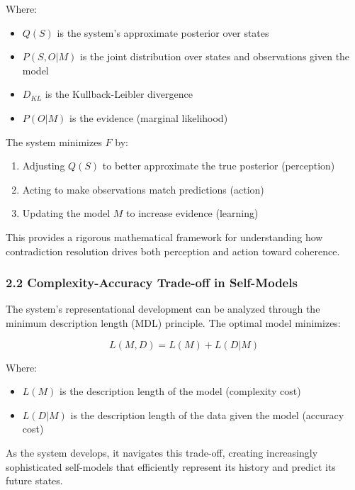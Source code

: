 \documentclass[
]{article}
\providecommand{\tightlist}{%
  \setlength{\itemsep}{0pt}\setlength{\parskip}{0pt}}
\begin{document}
Where:

\begin{itemize}
\tightlist
\item
  \(Q(S)\) is the system's approximate posterior over states
\item
  \(P(S, O|M)\) is the joint distribution over states and observations
  given the model
\item
  \(D_{KL}\) is the Kullback-Leibler divergence
\item
  \(P(O|M)\) is the evidence (marginal likelihood)
\end{itemize}

The system minimizes \(F\) by:

\begin{enumerate}
\def\labelenumi{\arabic{enumi}.}
\tightlist
\item
  Adjusting \(Q(S)\) to better approximate the true posterior
  (perception)
\item
  Acting to make observations match predictions (action)
\item
  Updating the model \(M\) to increase evidence (learning)
\end{enumerate}

This provides a rigorous mathematical framework for understanding how
contradiction resolution drives both perception and action toward
coherence.

\subsubsection{2.2 Complexity-Accuracy Trade-off in
Self-Models}\label{complexity-accuracy-trade-off-in-self-models}

The system's representational development can be analyzed through the
minimum description length (MDL) principle. The optimal model minimizes:

\[L(M, D) = L(M) + L(D|M)\]

Where:

\begin{itemize}
\tightlist
\item
  \(L(M)\) is the description length of the model (complexity cost)
\item
  \(L(D|M)\) is the description length of the data given the model
  (accuracy cost)
\end{itemize}

As the system develops, it navigates this trade-off, creating
increasingly sophisticated self-models that efficiently represent its
history and predict its future states.
\end{document}

